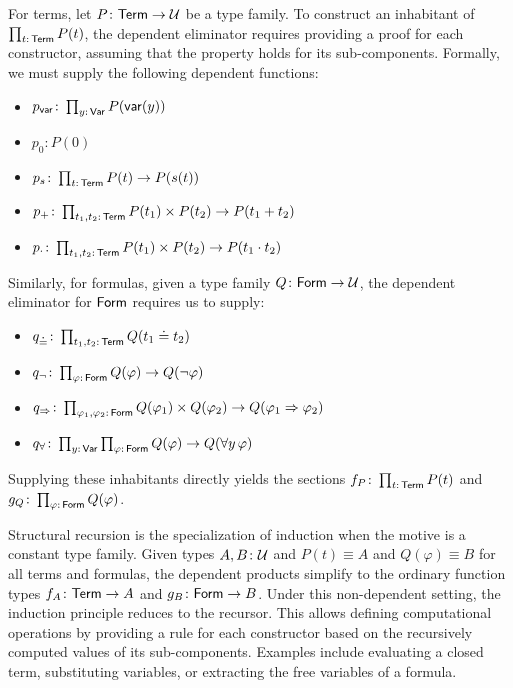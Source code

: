 For terms, let $P\colon\fun{Term}\to\univ$ be a type family. To construct an inhabitant of $\prod_{t\colon\fun{Term}}P(t)$, the dependent eliminator requires providing a proof for each constructor, assuming that the property holds for its sub-components. Formally, we must supply the following dependent functions:
\begin{itemize}
    \item $p_{\fun{var}}\colon\prod_{y\colon\fun{Var}}P(\fun{var}(y))$
    \item $p_0\colon P(0)$
    \item $p_s\colon\prod_{t\colon\fun{Term}}P(t)\to P(s(t))$
    \item $p_+\colon\prod_{t_1,t_2\colon\fun{Term}}P(t_1)\times P(t_2)\to P(t_1+t_2)$
    \item $p_\cdot\colon\prod_{t_1,t_2\colon\fun{Term}}P(t_1)\times P(t_2)\to P(t_1\cdot t_2)$
\end{itemize}
Similarly, for formulas, given a type family $Q\colon\fun{Form}\to\univ$, the dependent eliminator for $\mathsf{Form}$ requires us to supply:
\begin{itemize}
    \item $q_{\doteq}\colon\prod_{t_1,t_2\colon\fun{Term}}Q(t_1\doteq t_2)$
    \item $q_{\neg}\colon\prod_{\varphi\colon\fun{Form}}Q(\varphi)\to Q(\neg\varphi)$
    \item $q_{\imp}\colon\prod_{\varphi_1,\varphi_2\colon\fun{Form}}Q(\varphi_1)\times Q(\varphi_2)\to Q(\varphi_1\imp\varphi_2)$
    \item $q_{\forall}\colon\prod_{y\colon\fun{Var}}\prod_{\varphi\colon\fun{Form}}Q(\varphi)\to Q(\forall y\,\varphi)$
\end{itemize}
Supplying these inhabitants directly yields the sections $f_P\colon\prod_{t\colon\fun{Term}}P(t)$ and $g_Q\colon\prod_{\varphi\colon\fun{Form}}Q(\varphi)$.

Structural recursion is the specialization of induction when the motive is a constant type family. Given types $A,B\colon\univ$ and $P(t)\equiv A$ and $Q(\varphi)\equiv B$ for all terms and formulas, the dependent products simplify to the ordinary function types $f_A\colon\fun{Term}\to A$ and $g_B\colon\fun{Form}\to B$. Under this non-dependent setting, the induction principle reduces to the recursor. This allows defining computational operations by providing a rule for each constructor based on the recursively computed values of its sub-components. Examples include evaluating a closed term, substituting variables, or extracting the free variables of a formula.


